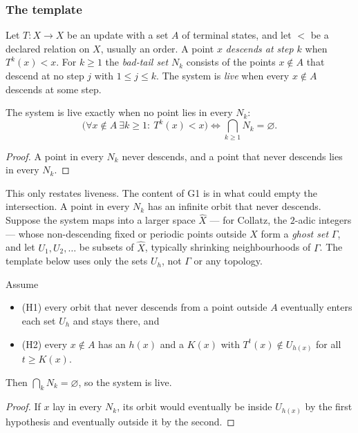 \subsubsection*{The template}

Let $T : X \to X$ be an update with a set $A$ of terminal states, and let $<$ be a declared
relation on $X$, usually an order. A point $x$ \emph{descends at step $k$} when $T^k(x) < x$. For
$k \ge 1$ the \emph{bad-tail set} $N_k$ consists of the points $x \notin A$ that descend at no step
$j$ with $1 \le j \le k$. The system is \emph{live} when every $x \notin A$ descends at some step.

\begin{proposition}\label{prop:G1}
The system is live exactly when no point lies in every $N_k$:
\[
  \bigl(\forall x \notin A\ \exists k \ge 1 :\ T^k(x) < x\bigr)
  \iff \bigcap_{k \ge 1} N_k = \varnothing .
\]
\end{proposition}

\begin{proof}
A point in every $N_k$ never descends, and a point that never descends lies in every $N_k$.
\end{proof}

This only restates liveness. The content of G1 is in what could empty the intersection. A point in
every $N_k$ has an infinite orbit that never descends. Suppose the system maps into a larger space
$\widehat X$ --- for Collatz, the $2$-adic integers --- whose non-descending fixed or periodic
points outside $X$ form a \emph{ghost set} $\Gamma$, and let $U_1, U_2, \ldots$ be subsets of
$\widehat X$, typically shrinking neighbourhoods of $\Gamma$. The template below uses only the sets
$U_h$, not $\Gamma$ or any topology.

\begin{schema}\label{thm:G1b}
Assume
\begin{itemize}
  \item \textup{(H1)} every orbit that never descends from a point outside $A$
    eventually enters each set $U_h$ and stays there, and
  \item \textup{(H2)} every $x \notin A$ has an $h(x)$ and a $K(x)$ with
    $T^t(x) \notin U_{h(x)}$ for all $t \ge K(x)$.
\end{itemize}
Then $\bigcap_k N_k = \varnothing$, so the system is live.
\end{schema}

\begin{proof}
If $x$ lay in every $N_k$, its orbit would eventually be inside $U_{h(x)}$ by the first hypothesis
and eventually outside it by the second.
\end{proof}

